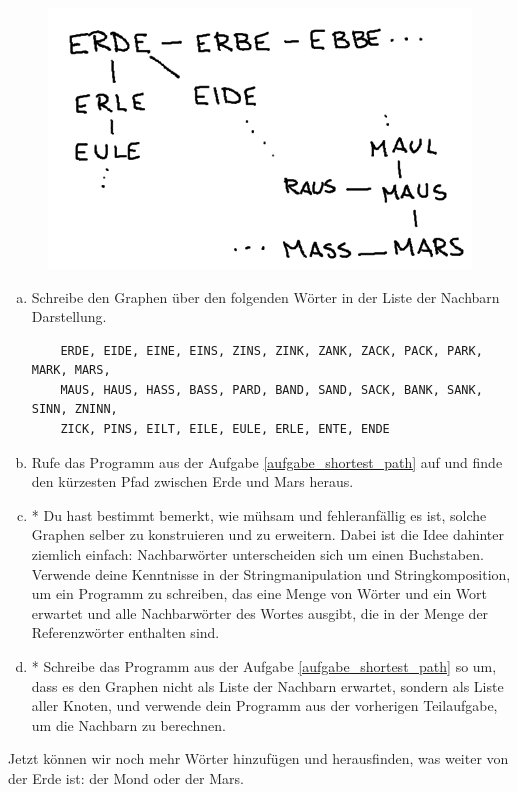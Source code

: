 \begin{figure}[H]
    \centering
    \includegraphics[width=\textwidth]{Pictures/SP/erde_mars_first_graph.png}
\end{figure}

\begin{aufgabe}\label{aufgabe_erde_mars_neighbours}
\begin{enumerate}[(a)]
    \item Schreibe den Graphen über den folgenden Wörter in der Liste der Nachbarn Darstellung.
    \begin{lstlisting}
    ERDE, EIDE, EINE, EINS, ZINS, ZINK, ZANK, ZACK, PACK, PARK, MARK, MARS,
    MAUS, HAUS, HASS, BASS, PARD, BAND, SAND, SACK, BANK, SANK, SINN, ZNINN,
    ZICK, PINS, EILT, EILE, EULE, ERLE, ENTE, ENDE
    \end{lstlisting}
    \item Rufe das Programm aus der Aufgabe \ref{aufgabe_shortest_path} auf und finde den kürzesten Pfad zwischen Erde und Mars heraus.
    \item * Du hast bestimmt bemerkt, wie mühsam und fehleranfällig es ist, solche Graphen selber zu konstruieren und zu erweitern. Dabei ist die Idee dahinter ziemlich einfach: Nachbarwörter unterscheiden sich um einen Buchstaben. Verwende deine Kenntnisse in der Stringmanipulation und Stringkomposition, um ein Programm zu schreiben, das eine Menge von Wörter und ein Wort erwartet und alle Nachbarwörter des Wortes ausgibt, die in der Menge der Referenzwörter enthalten sind.
    \item * Schreibe das Programm aus der Aufgabe \ref{aufgabe_shortest_path} so um, dass es den Graphen nicht als Liste der Nachbarn erwartet, sondern als Liste aller Knoten, und verwende dein Programm aus der vorherigen Teilaufgabe, um die Nachbarn zu berechnen.
\end{enumerate}
\end{aufgabe}
Jetzt können wir noch mehr Wörter hinzufügen und herausfinden, was weiter von der Erde ist: der Mond oder der Mars.

